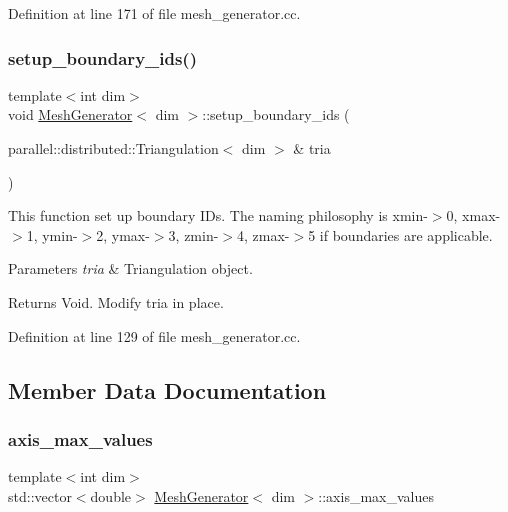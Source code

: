 Definition at line 171 of file mesh\+\_\+generator.\+cc.

\mbox{\label{class_mesh_generator_a661d4e5efeb3ee94cc70c5da8e94a0ee}} 
\subsubsection{\texorpdfstring{setup\+\_\+boundary\+\_\+ids()}{setup\_boundary\_ids()}}
{\footnotesize\ttfamily template$<$int dim$>$ \\
void \hyperlink{class_mesh_generator}{Mesh\+Generator}$<$ dim $>$\+::setup\+\_\+boundary\+\_\+ids (\begin{DoxyParamCaption}\item[{parallel\+::distributed\+::\+Triangulation$<$ dim $>$ \&}]{tria }\end{DoxyParamCaption})\hspace{0.3cm}{\ttfamily [private]}}

This function set up boundary I\+Ds. The naming philosophy is xmin-\/$>$0, xmax-\/$>$1, ymin-\/$>$2, ymax-\/$>$3, zmin-\/$>$4, zmax-\/$>$5 if boundaries are applicable.


\begin{DoxyParams}{Parameters}
{\em tria} & Triangulation object. \\
\hline
\end{DoxyParams}
\begin{DoxyReturn}{Returns}
Void. Modify tria in place. 
\end{DoxyReturn}


Definition at line 129 of file mesh\+\_\+generator.\+cc.



\subsection{Member Data Documentation}
\mbox{\label{class_mesh_generator_ab65cdce3616c05ca7b02f88a63c7a403}} 
\subsubsection{\texorpdfstring{axis\+\_\+max\+\_\+values}{axis\_max\_values}}
{\footnotesize\ttfamily template$<$int dim$>$ \\
std\+::vector$<$double$>$ \hyperlink{class_mesh_generator}{Mesh\+Generator}$<$ dim $>$\+::axis\+\_\+max\+\_\+values\hspace{0.3cm}{\ttfamily [private]}}



